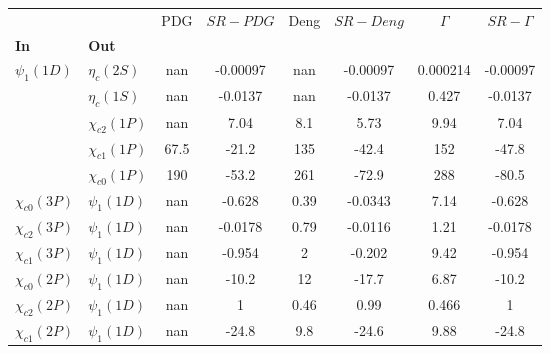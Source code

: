 \begin{tabular}{l|l|c|c|c|c|c|c}
\toprule
                &                &  PDG & $SR-PDG$ &  Deng & $SR-Deng$ &  $\Gamma$ & $SR-\Gamma$ \\
\textbf{In} & \textbf{Out} &      &          &       &           &           &             \\
\midrule
\textbf{$\psi_{1}(1D)$} & \textbf{$\eta_{c}(2S)$} &  nan & -0.00097 &   nan &  -0.00097 &  0.000214 &    -0.00097 \\
                & \textbf{$\eta_{c}(1S)$} &  nan &  -0.0137 &   nan &   -0.0137 &     0.427 &     -0.0137 \\
                & \textbf{$\chi_{c2}(1P)$} &  nan &     7.04 &   8.1 &      5.73 &      9.94 &        7.04 \\
                & \textbf{$\chi_{c1}(1P)$} & 67.5 &    -21.2 &   135 &     -42.4 &       152 &       -47.8 \\
                & \textbf{$\chi_{c0}(1P)$} &  190 &    -53.2 &   261 &     -72.9 &       288 &       -80.5 \\
\textbf{$\chi_{c0}(3P)$} & \textbf{$\psi_{1}(1D)$} &  nan &   -0.628 &  0.39 &   -0.0343 &      7.14 &      -0.628 \\
\textbf{$\chi_{c2}(3P)$} & \textbf{$\psi_{1}(1D)$} &  nan &  -0.0178 &  0.79 &   -0.0116 &      1.21 &     -0.0178 \\
\textbf{$\chi_{c1}(3P)$} & \textbf{$\psi_{1}(1D)$} &  nan &   -0.954 &     2 &    -0.202 &      9.42 &      -0.954 \\
\textbf{$\chi_{c0}(2P)$} & \textbf{$\psi_{1}(1D)$} &  nan &    -10.2 &    12 &     -17.7 &      6.87 &       -10.2 \\
\textbf{$\chi_{c2}(2P)$} & \textbf{$\psi_{1}(1D)$} &  nan &        1 &  0.46 &      0.99 &     0.466 &           1 \\
\textbf{$\chi_{c1}(2P)$} & \textbf{$\psi_{1}(1D)$} &  nan &    -24.8 &   9.8 &     -24.6 &      9.88 &       -24.8 \\
\bottomrule
\end{tabular}
